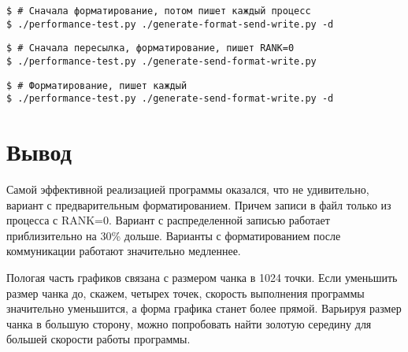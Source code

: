\documentclass[12pt,a4paper]{article}
\begin{document}
\begin{Verbatim}
$ # Сначала форматирование, потом пишет каждый процесс
$ ./performance-test.py ./generate-format-send-write.py -d
\end{Verbatim}

\newpage

\begin{Verbatim}
$ # Сначала пересылка, форматирование, пишет RANK=0
$ ./performance-test.py ./generate-send-format-write.py
\end{Verbatim}

\newpage

\begin{Verbatim}
$ # Форматирование, пишет каждый
$ ./performance-test.py ./generate-send-format-write.py -d
\end{Verbatim}


\section{Вывод}

Самой эффективной реализацией программы оказался, что не удивительно,
вариант с предварительным форматированием. Причем записи в файл только
из процесса с RANK=0. Вариант с распределенной записью работает приблизительно
на 30\% дольше. Варианты с форматированием после коммуникации работают
значительно медленнее.

Пологая часть графиков связана с размером чанка в 1024 точки. Если уменьшить размер
чанка до, скажем, четырех точек, скорость выполнения программы значительно уменьшится,
а форма графика станет более прямой. Варьируя размер чанка в большую сторону, можно
попробовать найти золотую середину для большей скорости работы программы.
\end{document}
